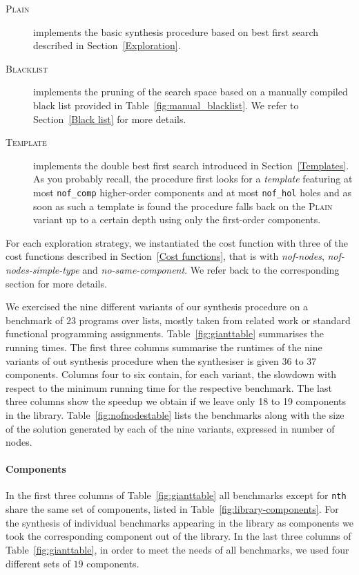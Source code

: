 \begin{description}
\item[\mdseries\textsc{Plain}] implements the basic synthesis procedure based on best first search described in Section~\ref{Exploration}.
\item[\mdseries\textsc{Blacklist}] implements the pruning of the search space based on a manually compiled black list provided in Table~\ref{fig:manual_blacklist}. We refer to Section~\ref{Black list} for more details.
\item[\mdseries\textsc{Template}] implements the double best first search introduced in Section~\ref{Templates}. As you probably recall, the procedure first looks for a \emph{template} featuring at most \lstinline?nof_comp? higher-order components and at most \lstinline?nof_hol? holes and as soon as such a template is found the procedure falls back on the \textsc{Plain} variant up to a certain depth using only the first-order components.
\end{description}

For each exploration strategy, we instantiated the cost function with three of the cost functions described in Section~\ref{Cost functions}, that is with \textit{nof-nodes}, \textit{nof-nodes-simple-type} and \textit{no-same-component}. We refer back to the corresponding section for more details.

We exercised the nine different variants of our synthesis procedure on a benchmark of $23$ programs over lists, mostly taken from related work or standard functional programming assignments.
Table~\ref{fig:gianttable} summarises the running times. The first three columns summarise the runtimes of the nine variants of out synthesis procedure when the synthesiser is given 36 to 37 components. Columns four to six contain, for each variant, the slowdown with respect to the minimum running time for the respective benchmark. The last three columns show the speedup we obtain if we leave only 18 to 19 components in the library.
Table~\ref{fig:nofnodestable} lists the benchmarks along with the size of the solution generated by each of the nine variants, expressed in number of nodes.

\paragraph{Components} In the first three columns of Table~\ref{fig:gianttable} all benchmarks except for \lstinline?nth? share the same set of components, listed in Table~\ref{fig:library-components}. For the synthesis of individual benchmarks appearing in the library as components we took the corresponding component out of the library.
In the last three columns of Table~\ref{fig:gianttable}, in order to meet the needs of all benchmarks, we used four different sets of $19$ components.

